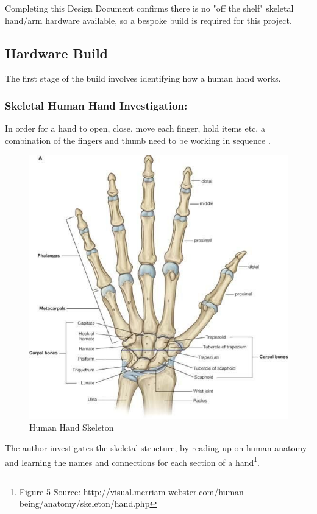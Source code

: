 \documentclass[progress]{cmpreport}
\begin{document}
Completing this Design Document confirms there is no "off the shelf" skeletal hand/arm hardware available, so a bespoke build is required for this project.

\subsection{Hardware Build}
The first stage of the build involves identifying how a human hand works.  

\subsubsection{Skeletal Human Hand Investigation:}
In order for a hand to open, close, move each finger, hold items etc, a combination of the fingers and thumb need to be working in sequence \citep{freivalds2011biomechanics}. 
\begin{figure}
	\caption{Human Hand Skeleton} 
	\includegraphics[width=1.0\linewidth]{photos/hand.jpg}  
\end{figure}
The author investigates the skeletal structure, by reading up on human anatomy and learning the names and connections for each section of a hand\footnote {Figure 5 Source: http://visual.merriam-webster.com/human-being/anatomy/skeleton/hand.php}.
\end{document}
